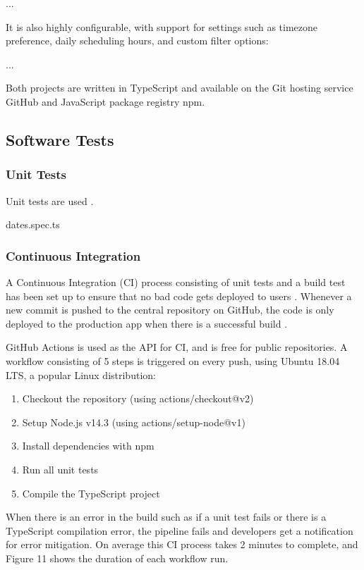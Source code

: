 \documentclass{article}
\begin{document}
...

It is also highly configurable, with support for settings such as timezone preference, daily scheduling hours, and custom filter options:

...

Both projects are written in TypeScript and available on the Git hosting service GitHub and JavaScript package registry npm.

\subsection{Software Tests}

\subsubsection{Unit Tests}

Unit tests are used \cite{tosun_effectiveness_2018}.

dates.spec.ts

\subsubsection{Continuous Integration}

A Continuous Integration (CI) process consisting of unit tests and a build test has been set up to ensure that no bad code gets deployed to users \cite{li_extensive_2020}. Whenever a new commit is pushed to the central repository on GitHub, the code is only deployed to the production app when there is a successful build \cite{noauthor_what_2019}.

GitHub Actions is used as the API for CI, and is free for public repositories. A workflow consisting of 5 steps is triggered on every push, using Ubuntu  18.04 LTS, a popular Linux distribution:

\begin{enumerate}
	\item Checkout the repository (using actions/checkout@v2)
	\item Setup Node.js v14.3 (using actions/setup-node@v1)
	\item Install dependencies with npm
	\item Run all unit tests
	\item Compile the TypeScript project
\end{enumerate}

When there is an error in the build such as if a unit test fails or there is a TypeScript compilation error, the pipeline fails and developers get a notification for error mitigation. On average this CI process takes 2 minutes to complete, and Figure 11 shows the duration of each workflow run.
\end{document}
